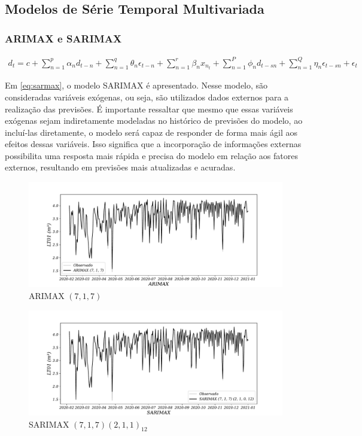 \subsection{Modelos de S\'erie Temporal Multivariada}\label{subsec:mult}

\subsubsection{ARIMAX e SARIMAX}

\begin{eqnarray}
	d_t=c+\sum_{n=1}^p \alpha_n d_{t-n}+\sum_{n=1}^q \theta_n \epsilon_{t-n}+\sum_{n=1}^r \beta_n x_{n_t}+\sum_{n=1}^P \phi_n d_{t-s n}+\sum_{n=1}^Q \eta_n \epsilon_{t-s n}+\epsilon_t \label{eq:sarmax}
\end{eqnarray}

Em \eqref{eq:sarmax}, o modelo SARIMAX é apresentado. Nesse modelo, são consideradas variáveis exógenas, ou seja, são utilizados dados externos para a realização das previsões. É importante ressaltar que mesmo que essas variáveis exógenas sejam indiretamente modeladas no histórico de previsões do modelo, ao incluí-las diretamente, o modelo será capaz de responder de forma mais ágil aos efeitos dessas variáveis. Isso significa que a incorporação de informações externas possibilita uma resposta mais rápida e precisa do modelo em relação aos fatores externos, resultando em previsões mais atualizadas e acuradas.

\begin{figure}[H]
	\centering
	\caption{ARIMAX $(7,1,7)$  }
	\label{fig:1-arimax}
	\includegraphics[width=0.9\linewidth]{Modelos/Figuras/0-ARIMAX}
	
\end{figure}

\begin{figure}[H]
	\centering
	\caption{SARIMAX $(7,1,7) (2,1,1)_{12}$  }
	\label{fig:1-sarimax}
	\includegraphics[width=0.9\linewidth]{Modelos/Figuras/0-SARIMAX}
	
\end{figure}


